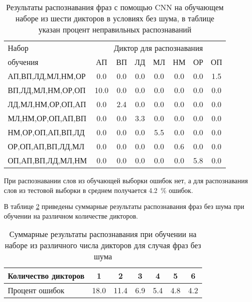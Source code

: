 \begin{table}[h]
	\centering
	\caption{Результаты распознавания фраз с помощью CNN на обучающем наборе из шести дикторов в условиях без шума, в таблице указан процент неправильных распознаваний}
	\label{tab:cnn_phrases_6dictors}
	\begin{tabular}{| l | c | c | c | c | c | c | c |}
		\hline
		Набор & \multicolumn{7}{c|}{Диктор для распознавания} \\
		\hhline{~-------}
		обучения & \phantom{0}АП\phantom{0} & \phantom{0}ВП\phantom{0} & \phantom{0}ЛД\phantom{0} & \phantom{0}МЛ\phantom{0} & \phantom{0}НМ\phantom{0} & \phantom{0}ОР\phantom{0} & \phantom{0}ОП\phantom{0} \\
		\hline
		АП,ВП,ЛД,МЛ,НМ,ОР	 &  0.0 &  0.0 &  0.0 &  0.0 &  0.0 &  0.0 &  1.5 \\
		ВП,ЛД,МЛ,НМ,ОР,ОП	 & 10.0 &  0.0 &  0.0 &  0.0 &  0.0 &  0.0 &  0.0 \\
		ЛД,МЛ,НМ,ОР,ОП,АП	 &  0.0 &  2.4 &  0.0 &  0.0 &  0.0 &  0.0 &  0.0 \\
		МЛ,НМ,ОР,ОП,АП,ВП	 &  0.0 &  0.0 &  3.3 &  0.0 &  0.0 &  0.0 &  0.0 \\
		НМ,ОР,ОП,АП,ВП,ЛД	 &  0.0 &  0.0 &  0.0 &  5.5 &  0.0 &  0.0 &  0.0 \\
		ОР,ОП,АП,ВП,ЛД,МЛ	 &  0.0 &  0.0 &  0.0 &  0.0 &  0.6 &  0.0 &  0.0 \\
		ОП,АП,ВП,ЛД,МЛ,НМ	 &  0.0 &  0.0 &  0.0 &  0.0 &  0.0 &  5.8 &  0.0 \\
		\hline
	\end{tabular}
\end{table}

При распознавании слов из обучающей выборки ошибок нет, а для распознавания слов из тестовой выборки в среднем получается 4.2~\% ошибок.

В таблице \ref{tab:cnn_phrases_without_noise_summary} приведены суммарные результаты распознавания фраз без шума при обучении на различном количестве дикторов.

\begin{table}[h]
	\centering
	\caption{Суммарные результаты распознавания при обучении на наборе из различного числа дикторов для случая фраз без шума}
	\label{tab:cnn_phrases_without_noise_summary}
	\begin{tabular}{| l | c | c | c | c | c | c |}
		\hline
		Количество дикторов \phantom{00} & \phantom{00} 1 \phantom{00} & \phantom{00} 2 \phantom{00} & \phantom{00} 3 \phantom{00} & \phantom{00} 4 \phantom{00} & \phantom{00} 5 \phantom{00} & \phantom{00} 6 \phantom{00} \\
		\hline
		Процент ошибок 		& 18.0 & 11.4 & 6.9 & 5.4 & 4.8 & 4.2 \\
		\hline
	\end{tabular}
\end{table}

